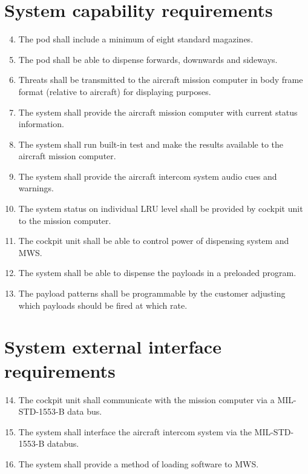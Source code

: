 \documentclass[Main]{subfiles}
\begin{document}
\section{System capability requirements}
\begin{enumerate}[{SR}-1]
\setcounter{enumi}{3}
\item The pod shall include a minimum of eight standard magazines.\label{SR-4}

\item The pod shall be able to dispense forwards, downwards and sideways. \label{SR-5}

\item Threats shall be transmitted to the aircraft mission computer in body frame format (relative to aircraft) for displaying purposes.\label{SR-6}

\item The system shall provide the aircraft mission computer with current status information.\label{SR-7}

\item The system shall run built-in test and make the results available to the aircraft mission computer.\label{SR-8}

\item The system shall provide the aircraft intercom system audio cues and warnings.\label{SR-9}

\item The system status on individual LRU level shall be provided by cockpit unit to the mission computer.\label{SR-10}

\item The cockpit unit shall be able to control power of dispensing system and MWS.\label{SR-11}

\item The system shall be able to dispense the payloads in a preloaded program. \label{SR-12}

\item The payload patterns shall be programmable by the customer adjusting which payloads should be fired at which rate.\label{SR-13}
\end{enumerate}

\section{System external interface requirements}

\begin{enumerate}[{SR}-1]
\setcounter{enumi}{13}
\item The cockpit unit shall communicate with the mission computer via a MIL-STD-1553-B data bus.\label{SR-14}

\item The system shall interface the aircraft intercom system via the MIL-STD-1553-B databus.\label{SR-15}

\item The system shall provide a method of loading software to MWS.\label{SR-16}
\end{enumerate}
\end{document}
